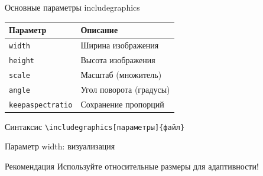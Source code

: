 \documentclass[utf8, 12pt]{beamer}
\begin{document}
\begin{frame}{Основные параметры includegraphics}
    \begin{table}
        \centering
        \begin{tabular}{@{}lp{6cm}@{}}
            \toprule
            \textbf{Параметр} & \textbf{Описание} \\
            \midrule
            \texttt{width} & Ширина изображения \\
            \texttt{height} & Высота изображения \\
            \texttt{scale} & Масштаб (множитель) \\
            \texttt{angle} & Угол поворота (градусы) \\
            \texttt{keepaspectratio} & Сохранение пропорций \\
            \bottomrule
        \end{tabular}
    \end{table}
    
    \vspace{0.5cm}
    
    \begin{exampleblock}{Синтаксис}
        \texttt{\textbackslash includegraphics[параметры]\{файл\}}
    \end{exampleblock}
\end{frame}

\begin{frame}{Параметр width: визуализация}
    \begin{center}
    \end{center}
    
    \begin{alertblock}{Рекомендация}
        Используйте относительные размеры для адаптивности!
    \end{alertblock}
\end{frame}
\end{document}
